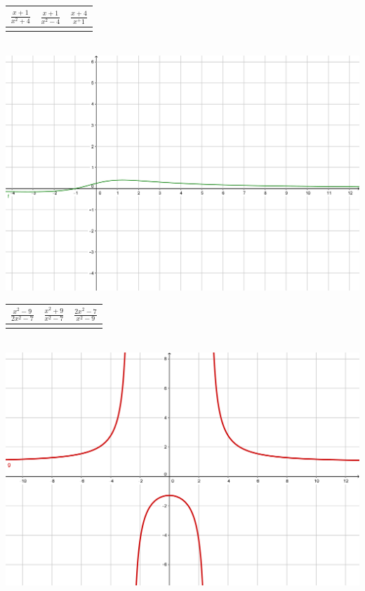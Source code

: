 \documentclass[a4paper,11pt,spanish,sans]{exam}
\newcommand{\Ts}{\rule{0pt}{2.6ex}}       %
\newcommand{\Bs}{\rule[-1.2ex]{0pt}{0pt}} %
\begin{document}
\begin{minipage}{0.45\textwidth}
\centering
\label{mc1}
\begin{tabular}{|c|c|c|}
\hline
$\frac{x+1}{x^2+4}$  & $\frac{x+1}{x^2-4}$ & $\frac{x+4}{x^+1}$\Ts \Bs   \\ \hline
   &   &      \\ \hline
\end{tabular}\\
\centering
\includegraphics[width= 0.9\linewidth]{primerproblema.png}
\end{minipage}
\begin{minipage}{.45\textwidth}
\centering
\begin{tabular}{|c|c|c|}
\hline
$\frac{x^2-9}{2x^2-7}$  & $\frac{x^2+9}{x^2-7}$ & $\frac{2x^2-7}{x^2-9}$ \Ts \Bs  \\ \hline
   &   &      \\ \hline
\end{tabular}\\
\centering
\includegraphics[width= 0.9\linewidth]{problema2guia.png}
\end{minipage}
\end{document}
